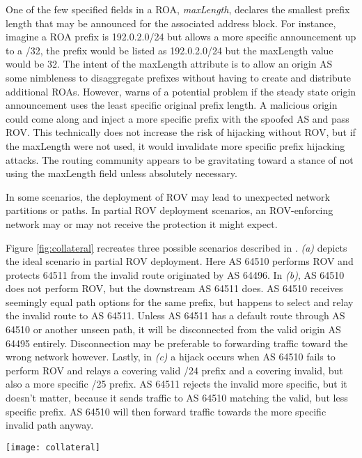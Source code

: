 \documentclass[sigconf]{acmart}
\begin{document}
One of the few specified fields in a ROA, \emph{maxLength}, declares the
smallest prefix length that may be announced for the associated address
block.  For instance, imagine a ROA prefix is 192.0.2.0/24 but allows a
more specific announcement up to a /32, the prefix would be listed as
192.0.2.0/24 but the maxLength value would be 32.  The intent of the
maxLength attribute is to allow an origin AS some nimbleness to
disaggregate prefixes without having to create and distribute additional
ROAs.  However, \cite{gilad_are_2017} warns of a potential problem if
the steady state origin announcement uses the least specific original
prefix length.  A malicious origin could come along and inject a more
specific prefix with the spoofed AS and pass ROV.  This technically does
not increase the risk of hijacking without ROV, but if the maxLength
were not used, it would invalidate more specific prefix hijacking
attacks.  The routing community appears to be gravitating toward a
stance of not using the maxLength field unless absolutely necessary.

In some scenarios, the deployment of ROV may lead to unexpected network
partitions or paths.  In partial ROV deployment scenarios, an
ROV-enforcing network may or may not receive the protection it might
expect.

Figure \ref{fig:collateral} recreates three possible scenarios described
in \cite{gilad_are_2017}.  \emph{(a)} depicts the ideal scenario in
partial ROV deployment.  Here AS 64510 performs ROV and protects 64511
from the invalid route originated by AS 64496.  In \emph{(b)}, AS 64510
does not perform ROV, but the downstream AS 64511 does.  AS 64510
receives seemingly equal path options for the same prefix, but happens
to select and relay the invalid route to AS 64511.  Unless AS 64511 has
a default route through AS 64510 or another unseen path, it will be
disconnected from the valid origin AS 64495 entirely.  Disconnection may
be preferable to forwarding traffic toward the wrong network however.
Lastly, in \emph{(c)} a hijack occurs when  AS 64510 fails to perform
ROV and relays a covering valid /24 prefix and a covering invalid, but
also a more specific /25 prefix.  AS 64511 rejects the invalid more
specific, but it doesn't matter, because it sends traffic to AS 64510
matching the valid, but less specific prefix.  AS 64510 will then
forward traffic towards the more specific invalid path anyway.

\begin{figure*}
  \centering
    \texttt{[image: collateral]}
  \caption{Partial ROV adoption scenarios}
  \label{fig:collateral}
\end{figure*}
\end{document}
